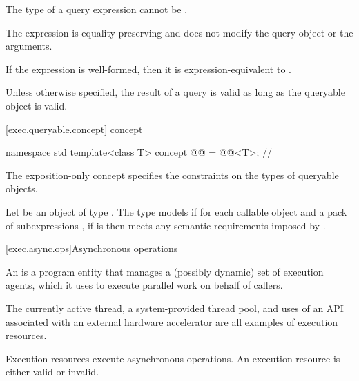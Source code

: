 \pnum
The type of a query expression cannot be .

\pnum
The expression  is
equality-preserving and
does not modify the query object or the arguments.

\pnum
If the expression  is well-formed,
then it is expression-equivalent to .

\pnum
Unless otherwise specified,
the result of a query is valid as long as the queryable object is valid.

[exec.queryable.concept]{ concept}

\begin{codeblock}
namespace std {
  template<class T>
    concept @@ = @@<T>;   // \expos
}
\end{codeblock}

\pnum
The exposition-only  concept specifies
the constraints on the types of queryable objects.

\pnum
Let  be an object of type .
The type  models 
if for each callable object  and a pack of subexpressions ,
if  is  then
 meets any semantic requirements imposed by .

[exec.async.ops]{Asynchronous operations}

\pnum
An  is a program entity that manages
a (possibly dynamic) set of execution agents,
which it uses to execute parallel work on behalf of callers.
\begin{example}
The currently active thread,
a system-provided thread pool, and
uses of an API associated with an external hardware accelerator
are all examples of execution resources.
\end{example}
Execution resources execute asynchronous operations.
An execution resource is either valid or invalid.

